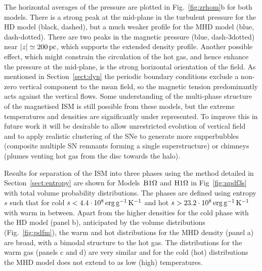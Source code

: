 \documentclass[useAMS,usenatbib]{mn2e}
\begin{document}
  The horizontal averages of the pressure are plotted in Fig.~\ref{fig:zrhom}b
  for both models. 
  There is a strong peak at the mid-plane in the turbulent pressure for the HD
  model (black, dashed), but a much weaker profile for the MHD model (blue,
  dash-dotted). 
  There are two peaks in the magnetic pressure (blue, dash-3dotted) near 
  $|z|\simeq200\,{\rm pc}$, which supports the extended density profile.
  Another possible effect, which might constrain the circulation of the hot
  gas, and hence enhance the pressure at the mid-plane, is the strong 
  horizontal orientation of the field.
  As mentioned in Section~\ref{sect:dyn} the periodic boundary conditions
  exclude a non-zero vertical component to the mean field, so the magnetic
  tension predominantly acts against the vertical flows.
  Some understanding of the multi-phase structure of the magnetised ISM is
  still possible from these models, but the extreme temperatures and densities
  are significantly under represented.
  To improve this in future work it will be desirable to allow unrestricted 
  evolution of vertical field and to apply realistic clustering of the 
  SNe to generate more supperbubbles (composite multiple SN remnants forming a
  single superstructure) or chimneys (plumes venting hot gas from the disc 
  towards the halo).

  Results for separation of the ISM into three phases using the method 
  detailed in Section~\ref{sect:entropy} are shown for Models~${\mathrm{B}1\rm{\Omega} }$ and
  ${\mathrm{H}1\rm{\Omega}}$ in Fig~\ref{fig:npdf3s} with total volume probability distributions.
  The phases are defined using entropy $s$ such that for cold 
  $s<4.4\cdot10^{8}\,{\rm erg} \,{\rm g}^{-1}\,{\rm K}^{-1}$ and hot 
  $s>23.2\cdot10^{8}\,{\rm erg} \,{\rm g}^{-1}\,{\rm K}^{-1}$ with warm in between.
  Apart from the higher densities for the cold phase with the HD model (panel 
  b), 
  anticipated by the volume distributions (Fig.~\ref{fig:pdfm}), the warm and
  hot distributions for the MHD density (panel a) are broad, with a bimodal 
  structure to the hot gas. 
  The distributions for the warm gas (panels c and d) are very similar and for the
  cold (hot) distributions the MHD model does not extend to as low (high)
  temperatures. 
  
\end{document}

